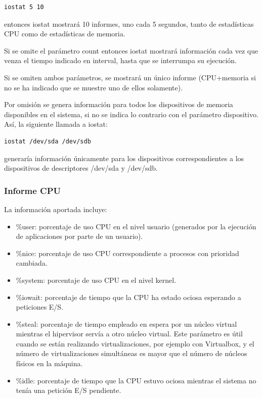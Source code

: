 \documentclass[a4paper,10pt]{article}
\renewcommand{\texttt}[2][black!60]{\textcolor{#1}{\ttfamily #2}}
\begin{document}
\begin{lstlisting}[style=BashInputStyle]
  iostat 5 10
\end{lstlisting}
  
entonces \texttt{iostat} mostrará 10 informes, uno cada 5 segundos, tanto de estadísticas CPU como de estadísticas de memoria.

Si se omite el parámetro \texttt{count} entonces \texttt{iostat} mostrará información cada vez que venza el tiempo indicado en \texttt{interval},
hasta que se interrumpa su ejecución.

Si se omiten ambos parámetros, se mostrará un único informe (CPU+memoria si no se ha indicado que se muestre uno de ellos solamente).

Por omisión se genera información para todos los dispositivos de memoria disponibles en el sistema, si no se indica lo contrario
con el parámetro \texttt{dispositivo}. Así, la siguiente llamada a \texttt{iostat}:

\begin{lstlisting}[style=BashInputStyle]
  iostat /dev/sda /dev/sdb
\end{lstlisting}

generaría información únicamente para los dispositivos correspondientes a los dispositivos de descriptores \texttt{/dev/sda} y \texttt{/dev/sdb}.

\subsubsection{Informe CPU}
La información aportada incluye:
\begin{itemize}
 \item \texttt{\%user}: porcentaje de uso CPU en el nivel usuario (generados por la ejecución de aplicaciones por parte de un usuario).
 \item \texttt{\%nice}: porcentaje de uso CPU correspondiente a procesos con prioridad cambiada.
 \item \texttt{\%system}: porcentaje de uso CPU en el nivel kernel.
 \item \texttt{\%iowait}: porcentaje de tiempo que la CPU ha estado ociosa esperando a peticiones E/S.
 \item \texttt{\%steal}: porcentaje de tiempo empleado en espera por un núcleo virtual mientras el hipervisor servía a otro
 núcleo virtual. Este parámetro es útil cuando se están realizando virtualizaciones, por ejemplo con Virtualbox, y el número de
 virtualizaciones simultáneas es mayor que el número de núcleos físicos en la máquina.
 \item \texttt{\%idle}: porcentaje de tiempo que la CPU estuvo ociosa mientras el sistema no tenía una petición E/S pendiente.
\end{itemize}
\end{document}
